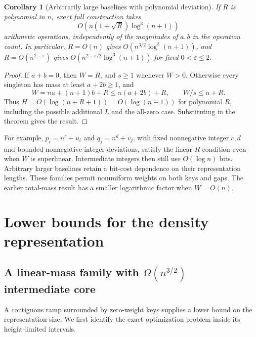 \documentclass[11pt]{article}
\newtheorem{corollary}[theorem]{Corollary}
\begin{document}
\begin{samepage}
\begin{corollary}[Arbitrarily large baselines with polynomial deviation]\label{cor:polynomial-deviation}
If $R$ is polynomial in $n$, exact full construction takes
\[
 O\!\left(n(1+\sqrt R)\log^3(n+1)\right)
\]
arithmetic operations, independently of the magnitudes of $a,b$ in the
operation count. In particular, $R=O(n)$ gives
$O(n^{3/2}\log^3(n+1))$, and $R=O(n^{2-\varepsilon})$ gives
$O(n^{2-\varepsilon/2}\log^3(n+1))$ for fixed $0<\varepsilon\le2$.
\end{corollary}
\end{samepage}
\begin{proof}
If $a+b=0$, then $W=R$, and $s\ge1$ whenever $W>0$. Otherwise every
singleton has mass at least $a+2b\ge1$, and
\[
 W=na+(n+1)b+R\le n(a+2b)+R,\qquad W/s\le n+R.
\]
Thus $H=O(\log(n+R+1))=O(\log(n+1))$ for polynomial $R$, including the
possible additional $L$ and the all-zero case. Substituting in the theorem
gives the result.
\end{proof}

For example, $p_i=n^c+u_i$ and $q_j=n^d+v_j$, with fixed nonnegative
integer $c,d$ and bounded nonnegative integer deviations, satisfy the
linear-$R$ condition even when $W$ is superlinear. Intermediate integers
then still use $O(\log n)$ bits. Arbitrary larger baselines retain a bit-cost
dependence on their representation lengths. These families permit nonuniform
weights on both keys and gaps.  The earlier total-mass result has a smaller
logarithmic factor when $W=O(n)$.



\section{Lower bounds for the density representation}
\label{sec:lower-bounds}
\subsection{A linear-mass family with \texorpdfstring{$\Omega(n^{3/2})$}{Omega(n to the power 3/2)} intermediate core}
\label{sec:ramp-tightness}
A contiguous ramp surrounded by zero-weight keys supplies a lower bound
on the representation size. We first identify the exact optimization
problem inside its height-limited intervals.
\end{document}
